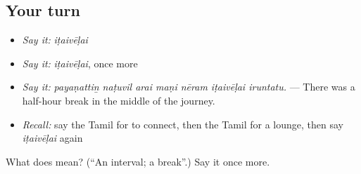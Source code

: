 \subsection*{Your turn}
\begin{itemize}
\raggedright
  \item \emph{Say it:} \emph{iṭaivēḷai}
  \item \emph{Say it:} \emph{iṭaivēḷai}, once more
  \item \emph{Say it:} \emph{payaṇattiṉ naṭuvil arai maṇi nēram iṭaivēḷai iruntatu.} — There was a half-hour break in the middle of the journey.
  \item \emph{Recall:} say the Tamil for to connect, then the Tamil for a lounge, then say \emph{iṭaivēḷai} again
\end{itemize}

\begin{tcolorbox}[breakable,colback=teal!4,colframe=teal!35!black,title={Before you move on}]
What does  mean? (\textquotedblleft{}An interval; a break\textquotedblright{}.) Say it once more.
\end{tcolorbox}
